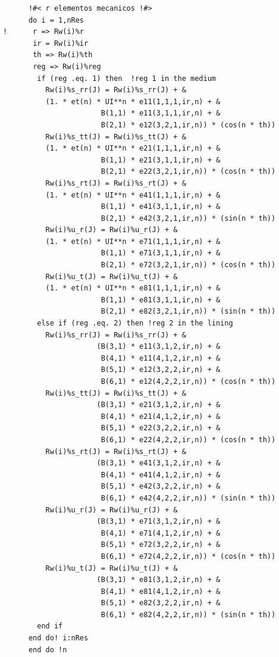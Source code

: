 \documentclass [11pt,spanish]{article}
\begin{document}
\begingroup
\fontsize{10pt}{12pt}
\selectfont
{}
\begin{shaded}
\begin{verbatim}
      !#< r elementos mecanicos !#>
      do i = 1,nRes
!      r => Rw(i)%r
       ir = Rw(i)%ir
       th => Rw(i)%th
       reg => Rw(i)%reg
        if (reg .eq. 1) then  !reg 1 in the medium
          Rw(i)%s_rr(J) = Rw(i)%s_rr(J) + &
          (1. * et(n) * UI**n * e11(1,1,1,ir,n) + &
                       B(1,1) * e11(3,1,1,ir,n) + &
                       B(2,1) * e12(3,2,1,ir,n)) * (cos(n * th))
          Rw(i)%s_tt(J) = Rw(i)%s_tt(J) + &
          (1. * et(n) * UI**n * e21(1,1,1,ir,n) + & 
                       B(1,1) * e21(3,1,1,ir,n) + & 
                       B(2,1) * e22(3,2,1,ir,n)) * (cos(n * th))
          Rw(i)%s_rt(J) = Rw(i)%s_rt(J) + &
          (1. * et(n) * UI**n * e41(1,1,1,ir,n) + & 
                       B(1,1) * e41(3,1,1,ir,n) + & 
                       B(2,1) * e42(3,2,1,ir,n)) * (sin(n * th))
          Rw(i)%u_r(J) = Rw(i)%u_r(J) + &
          (1. * et(n) * UI**n * e71(1,1,1,ir,n) + & 
                       B(1,1) * e71(3,1,1,ir,n) + & 
                       B(2,1) * e72(3,2,1,ir,n)) * (cos(n * th))
          Rw(i)%u_t(J) = Rw(i)%u_t(J) + &
          (1. * et(n) * UI**n * e81(1,1,1,ir,n) + & 
                       B(1,1) * e81(3,1,1,ir,n) + & 
                       B(2,1) * e82(3,2,1,ir,n)) * (sin(n * th))
        else if (reg .eq. 2) then !reg 2 in the lining
          Rw(i)%s_rr(J) = Rw(i)%s_rr(J) + &
                      (B(3,1) * e11(3,1,2,ir,n) + &
                       B(4,1) * e11(4,1,2,ir,n) + &
                       B(5,1) * e12(3,2,2,ir,n) + &
                       B(6,1) * e12(4,2,2,ir,n)) * (cos(n * th))
          Rw(i)%s_tt(J) = Rw(i)%s_tt(J) + &
                      (B(3,1) * e21(3,1,2,ir,n) + &
                       B(4,1) * e21(4,1,2,ir,n) + &
                       B(5,1) * e22(3,2,2,ir,n) + &
                       B(6,1) * e22(4,2,2,ir,n)) * (cos(n * th))
          Rw(i)%s_rt(J) = Rw(i)%s_rt(J) + &
                      (B(3,1) * e41(3,1,2,ir,n) + &
                       B(4,1) * e41(4,1,2,ir,n) + &
                       B(5,1) * e42(3,2,2,ir,n) + &
                       B(6,1) * e42(4,2,2,ir,n)) * (sin(n * th))
          Rw(i)%u_r(J) = Rw(i)%u_r(J) + &
                      (B(3,1) * e71(3,1,2,ir,n) + &
                       B(4,1) * e71(4,1,2,ir,n) + &
                       B(5,1) * e72(3,2,2,ir,n) + &
                       B(6,1) * e72(4,2,2,ir,n)) * (cos(n * th))
          Rw(i)%u_t(J) = Rw(i)%u_t(J) + &
                      (B(3,1) * e81(3,1,2,ir,n) + &
                       B(4,1) * e81(4,1,2,ir,n) + &
                       B(5,1) * e82(3,2,2,ir,n) + &
                       B(6,1) * e82(4,2,2,ir,n)) * (sin(n * th))
        end if
      end do! i:nRes
      end do !n
      

\end{verbatim}
\end{shaded}
\end{document}
